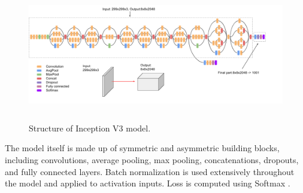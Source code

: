 \begin{figure}[H]
    \centering
    \includegraphics[height=58mm]{photos/chapter03/3.png}
    \caption{Structure of Inception V3 model.}
    \label{fig:incv3}
\end{figure}

\noindent The model itself is made up of symmetric and asymmetric building blocks, 
including convolutions, average pooling, max pooling, concatenations, 
dropouts, and fully connected layers. Batch normalization is used extensively 
throughout the model and applied to activation inputs. Loss is computed using Softmax \cite{dem19}.

